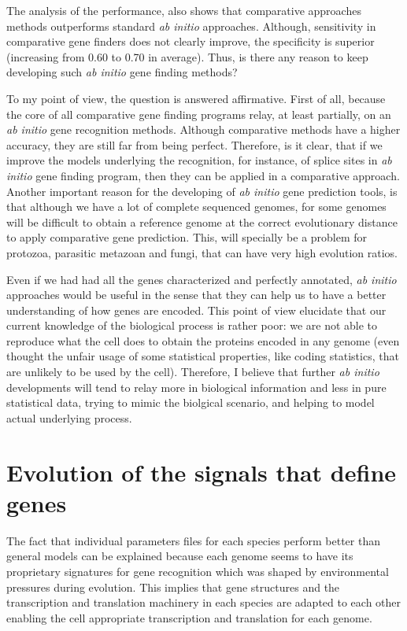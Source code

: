 The analysis of the performance, also shows that comparative approaches
methods outperforms standard \textit{ab initio} approaches. Although,
sensitivity in comparative gene finders does not clearly improve, the
specificity is superior (increasing from 0.60 to 0.70 in average).
Thus, is there any reason to keep developing such \textit{ab initio}
gene finding methods?

To my point of view, the question is answered affirmative. First of
all, because the core of all comparative gene finding programs relay,
at least partially, on an \textit{ab initio} gene recognition
methods. Although comparative methods have a higher accuracy, they are
still far from being perfect. Therefore, is it clear, that if we
improve the models underlying the recognition, for instance, of splice
sites in \textit{ab initio} gene finding program, then they can be
applied in a comparative approach. Another important reason for the
developing of \textit{ab initio} gene prediction tools, is that
although we have a lot of complete sequenced genomes, for some genomes
will be difficult to obtain a reference genome at the correct
evolutionary distance to apply comparative gene prediction. This, will
specially be a problem for protozoa, parasitic metazoan and fungi,
that can have very high evolution ratios.

Even if we had had all the genes characterized and perfectly
annotated, \textit{ab initio} approaches would be useful in the sense
that they can help us to have a better understanding of how genes are
encoded. This point of view elucidate that our current knowledge of
the biological process is rather poor: we are not able to reproduce
what the cell does to obtain the proteins encoded in any genome (even
thought the unfair usage of some statistical properties, like coding
statistics, that are unlikely to be used by the cell). Therefore, I
believe that further \textit{ab initio} developments will tend to
relay more in biological information and less in pure statistical
data, trying to mimic the biolgical scenario, and helping to model
actual underlying process.


\section{Evolution of the signals that define genes}

The fact that individual parameters files for each species perform
better than general models can be explained because each genome seems
to have its proprietary signatures for gene recognition which was
shaped by environmental pressures during evolution. This implies that
gene structures and the transcription and translation machinery in
each species are adapted to each other enabling the cell appropriate
transcription and translation for each genome.

